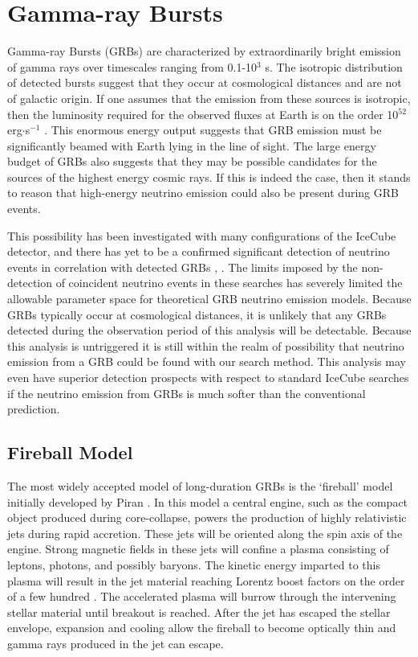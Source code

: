 \documentclass{gatech-thesis}
\begin{document}
\section{Gamma-ray Bursts}
Gamma-ray Bursts (GRBs) are characterized by extraordinarily bright emission of gamma rays over timescales ranging from 0.1-10$^3$ s. The isotropic distribution of detected bursts suggest that they occur at cosmological distances and are not of galactic origin. If one assumes that the emission from these sources is isotropic, then the luminosity required for the observed fluxes at Earth is on the order 10$^{52}$ erg$\cdot$s$^{-1}$ \cite{2004RvMP...76.1143P}. This enormous energy output suggests that GRB emission must be significantly beamed with Earth lying in the line of sight. The large energy budget of GRBs also suggests that they may be possible candidates for the sources of the highest energy cosmic rays. If this is indeed the case, then it stands to reason that high-energy neutrino emission could also be present during GRB events.

This possibility has been investigated with many configurations of the IceCube detector, and there has yet to be a confirmed significant detection of neutrino events in correlation with detected GRBs \cite{2011PhRvL.106n1101A}, \cite{2012Natur.484..351I}. The limits imposed by the non-detection of coincident neutrino events in these searches has severely limited the allowable parameter space for theoretical GRB neutrino emission models. Because GRBs typically occur at cosmological distances, it is unlikely that any GRBs detected during the observation period of this analysis will be detectable. Because this analysis is untriggered it is still within the realm of possibility that neutrino emission from a GRB could be found with our search method. This analysis may even have superior detection prospects with respect to standard IceCube searches if the neutrino emission from GRBs is much softer than the conventional prediction. 

\subsection{Fireball Model}
The most widely accepted model of long-duration GRBs is the `fireball' model initially developed by Piran \cite{2004RvMP...76.1143P}. In this model a central engine, such as the compact object produced during core-collapse, powers the production of highly relativistic jets during rapid accretion. These jets will be oriented along the spin axis of the engine. Strong magnetic fields in these jets will confine a plasma consisting of leptons, photons, and possibly baryons. The kinetic energy imparted to this plasma will result in the jet material reaching Lorentz boost factors on the order of a few hundred \cite{1992MNRAS.258P..41R}. The accelerated plasma will burrow through the intervening stellar material until breakout is reached. After the jet has escaped the stellar envelope, expansion and cooling allow the fireball to become optically thin and gamma rays produced in the jet can escape.
\end{document}
